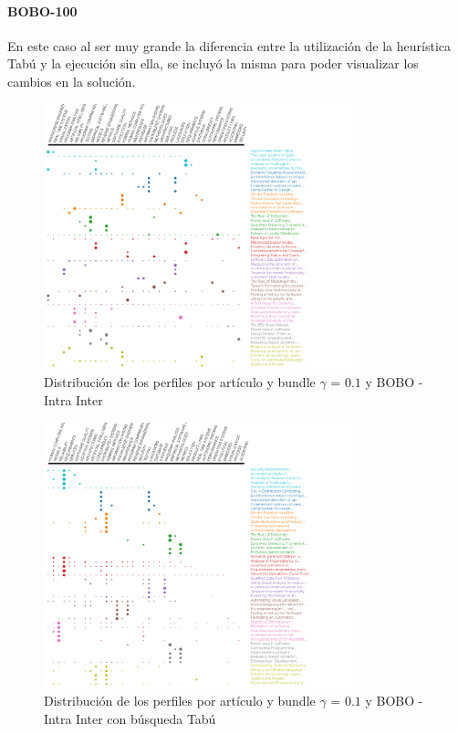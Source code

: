 \paragraph{BOBO-100}
En este caso al ser muy grande la diferencia entre la utilización de la heurística Tabú y la ejecución sin ella,  se incluyó la misma para poder visualizar los cambios en la solución.
\begin{figure}[H]
  \centering
    \includegraphics[width=0.8\textwidth]{resultados/papers/BOBO/INTRA_INTER/gamma-01.png}
  \caption{Distribución de los perfiles por artículo y bundle $\gamma$ = $0.1$ y BOBO - Intra Inter}
  \label{res:img-papers-gamma01-bobo-intra-inter}
\end{figure}

\begin{figure}[H]
  \centering
    \includegraphics[width=0.8\textwidth]{resultados/papers/BOBO/INTRA_INTER/gamma-with-local-01.png}
  \caption{Distribución de los perfiles por artículo y bundle $\gamma$ = $0.1$ y BOBO - Intra Inter con búsqueda Tabú}
  \label{res:img-papers-gamma01-bobo-intra-inter-tabu}
\end{figure}

